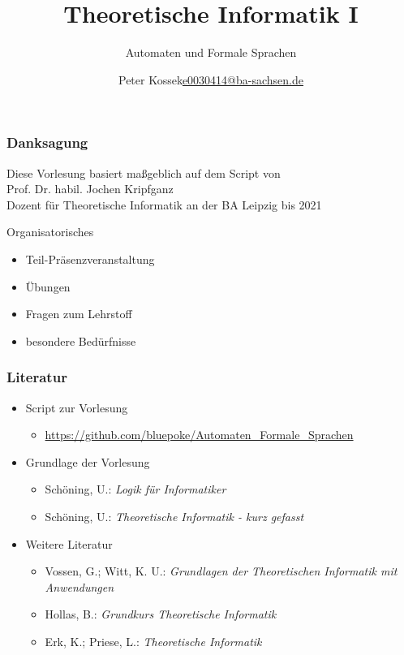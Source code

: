 \documentclass[18pt,aspectratio=169]{beamer}
\title{Theoretische Informatik I}
\subtitle{Automaten und Formale Sprachen}
\author{\texorpdfstring{Peter Kossek\newline\href{mailto:e0030414@ba-sachsen.de}{\scriptsize e0030414@ba-sachsen.de}}{Peter Kossek}}
\institute{Berufsakademie Sachsen, Staatliche Studienakademie Leipzig} %
\date{}
\begin{document}
\begin{frame}
	\titlepage
\end{frame}

\begin{frame}
	\frametitle{Danksagung}
	Diese Vorlesung basiert maßgeblich auf dem Script von\\
	Prof. Dr. habil. Jochen Kripfganz\\
	Dozent für Theoretische Informatik an der BA Leipzig bis 2021
\end{frame}

\begin{frame}{Organisatorisches}
	\begin{itemize}
		\item Teil-Präsenzveranstaltung
		\item Übungen
		\item Fragen zum Lehrstoff
		\item besondere Bedürfnisse
	\end{itemize}
\end{frame}

\AtBeginSection{
	\begin{frame}
		\sectionpage
		\tableofcontents[sectionstyle=hide/hide,subsectionstyle=show/show/hide]
	\end{frame}
}

\begin{frame}
	\frametitle{Literatur}
	\begin{itemize}
		\item Script zur Vorlesung
		\begin{itemize}
			\item \url{https://github.com/bluepoke/Automaten_Formale_Sprachen}
		\end{itemize}
		\item Grundlage der Vorlesung
		\begin{itemize}
			\item Schöning, U.: \textit{Logik für Informatiker}
			\item Schöning, U.: \textit{Theoretische Informatik - kurz gefasst}
		\end{itemize}
		\item Weitere Literatur
		\begin{itemize}
			\item Vossen, G.; Witt, K. U.: \textit{Grundlagen der Theoretischen Informatik mit Anwendungen}
			\item Hollas, B.: \textit{Grundkurs Theoretische Informatik}
			\item Erk, K.;  Priese, L.: \textit{Theoretische Informatik}
		\end{itemize}
	\end{itemize}
\end{frame}
\end{document}
